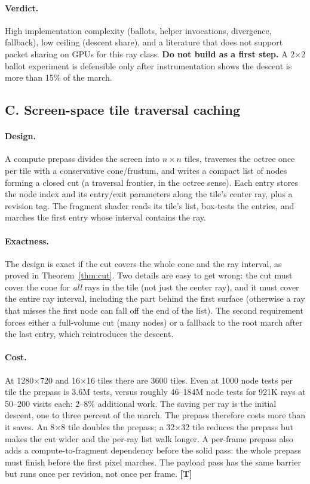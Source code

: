 \documentclass[11pt,a4paper]{article}
\newcommand{\evT}{\textsf{\textbf{\color{evT}[T]}}}
\theoremstyle{plain}
\theoremstyle{definition}
\theoremstyle{remark}
\begin{document}
\paragraph{Verdict.} High implementation complexity (ballots, helper
invocations, divergence, fallback), low ceiling (descent share), and a
literature that does not support packet sharing on GPUs for this ray class.
\textbf{Do not build as a first step.} A 2$\times$2 ballot experiment is
defensible only after instrumentation shows the descent is more than 15\% of
the march.

\subsection{C. Screen-space tile traversal caching}
\label{sec:C}

\paragraph{Design.} A compute prepass divides the screen into $n\times n$
tiles, traverses the octree once per tile with a conservative cone/frustum,
and writes a compact list of nodes forming a closed cut (a traversal frontier,
in the octree sense). Each entry stores the node index and its entry/exit
parameters along the tile's center ray, plus a revision tag. The fragment
shader reads its tile's list, box-tests the entries, and marches the first
entry whose interval contains the ray.

\paragraph{Exactness.} The design is exact if the cut covers the whole cone and
the ray interval, as proved in Theorem~\ref{thm:cut}. Two details are easy to
get wrong: the cut must cover the cone for \emph{all} rays in the tile (not
just the center ray), and it must cover the entire ray interval, including the
part behind the first surface (otherwise a ray that misses the first node can
fall off the end of the list). The second requirement forces either a
full-volume cut (many nodes) or a fallback to the root march after the last
entry, which reintroduces the descent.

\paragraph{Cost.} At 1280$\times$720 and 16$\times$16 tiles there are 3600
tiles. Even at 1000 node tests per tile the prepass is 3.6M tests, versus
roughly 46--184M node tests for 921K rays at 50--200 visits each: 2--8\%
additional work. The saving per ray is the initial descent, one to three
percent of the march. The prepass therefore costs more than it saves. An
8$\times$8 tile doubles the prepass; a 32$\times$32 tile reduces the prepass but
makes the cut wider and the per-ray list walk longer. A per-frame prepass also
adds a compute-to-fragment dependency before the solid pass: the whole prepass
must finish before the first pixel marches. The payload pass has the same
barrier but runs once per revision, not once per frame. \evT
\end{document}
